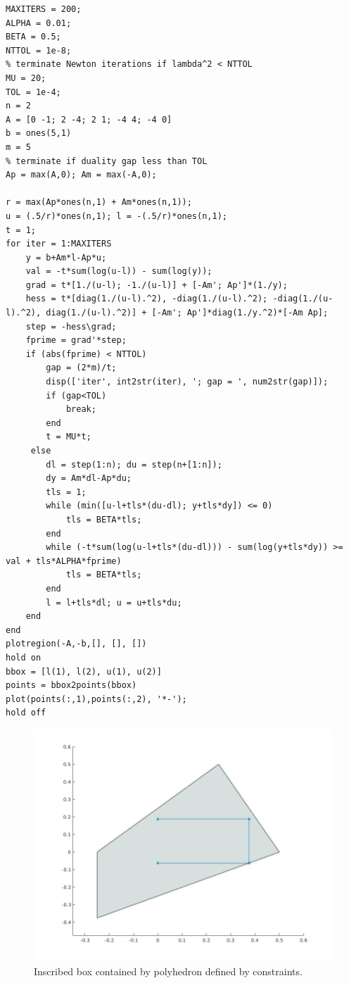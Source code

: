 \documentclass[12pt]{article}
\begin{document}
\begin{lstlisting}
MAXITERS = 200;
ALPHA = 0.01;
BETA = 0.5;
NTTOL = 1e-8;
% terminate Newton iterations if lambda^2 < NTTOL
MU = 20;
TOL = 1e-4;
n = 2
A = [0 -1; 2 -4; 2 1; -4 4; -4 0]
b = ones(5,1)
m = 5
% terminate if duality gap less than TOL
Ap = max(A,0); Am = max(-A,0);

r = max(Ap*ones(n,1) + Am*ones(n,1));
u = (.5/r)*ones(n,1); l = -(.5/r)*ones(n,1);
t = 1;
for iter = 1:MAXITERS
    y = b+Am*l-Ap*u;
    val = -t*sum(log(u-l)) - sum(log(y));
    grad = t*[1./(u-l); -1./(u-l)] + [-Am'; Ap']*(1./y);
    hess = t*[diag(1./(u-l).^2), -diag(1./(u-l).^2); -diag(1./(u-l).^2), diag(1./(u-l).^2)] + [-Am'; Ap']*diag(1./y.^2)*[-Am Ap];
    step = -hess\grad; 
    fprime = grad'*step;
    if (abs(fprime) < NTTOL)
        gap = (2*m)/t;
        disp(['iter', int2str(iter), '; gap = ', num2str(gap)]);
        if (gap<TOL)
            break;
        end
        t = MU*t;
     else
        dl = step(1:n); du = step(n+[1:n]);
        dy = Am*dl-Ap*du;
        tls = 1;
        while (min([u-l+tls*(du-dl); y+tls*dy]) <= 0)
            tls = BETA*tls;
        end
        while (-t*sum(log(u-l+tls*(du-dl))) - sum(log(y+tls*dy)) >= val + tls*ALPHA*fprime)
            tls = BETA*tls;
        end
        l = l+tls*dl; u = u+tls*du;
    end
end
plotregion(-A,-b,[], [], [])
hold on
bbox = [l(1), l(2), u(1), u(2)]
points = bbox2points(bbox)
plot(points(:,1),points(:,2), '*-');
hold off
\end{lstlisting}
\begin{figure}[ht]
    \centering
    \includegraphics[width=\textwidth]{inscribed_box.jpg}
    \caption{Inscribed box contained by polyhedron defined by constraints.}
\end{figure}
 
\end{document}
